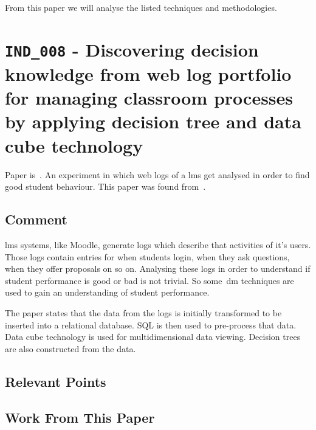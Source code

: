 From this paper we will analyse the listed techniques and methodologies.

\section{\texttt{IND\_008} - Discovering decision knowledge from web log
portfolio for managing classroom processes by applying decision tree and data
cube technology}


Paper is~\cite{ind_008}. An experiment in which web logs of a \gls{lms} get
analysed in order to find good student behaviour. This paper was found
from~\cite{ind_007}.

\subsection{Comment}

\gls{lms} systems, like Moodle, generate logs which describe that activities of
it's users. Those logs contain entries for when students login, when they ask
questions, when they offer proposals on so on. Analysing these logs in order to
understand if student performance is good or bad is not trivial. So
some~\gls{dm} techniques are used to gain an understanding of student
performance.

The paper states that the data from the logs is initially transformed to be
inserted into a relational database. SQL is then used to pre-process that data.
Data cube technology is used for multidimensional data viewing. Decision trees
are also constructed from the data.

\subsection{Relevant Points}


\subsection{Work From This Paper}

